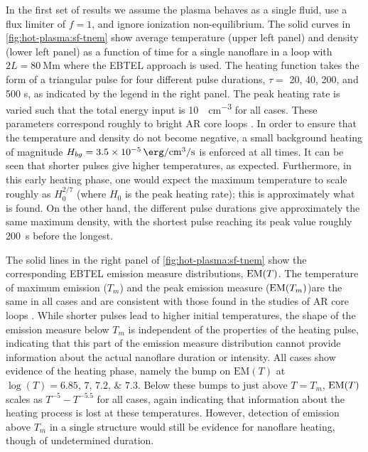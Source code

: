 In the first set of results we assume the plasma behaves as a single fluid, use a flux limiter of $f=1$, and ignore ionization non-equilibrium. The solid curves in \autoref{fig:hot-plasma:sf-tnem} show average temperature (upper left panel) and density (lower left panel) as a function of time for a single nanoflare in a loop with $2L = \SI{80}{\mega\m}$ where the EBTEL approach is used.  The heating function takes the form of a triangular pulse for four different pulse durations, $\tau=$ 20, 40, 200, and 500 s, as indicated by the legend in the right panel. The peak heating rate is varied such that the total energy input is \SI{10}{\erg\per\cubic\cm} for all cases. These parameters correspond roughly to bright AR core loops \citep{warren_systematic_2012}. In order to ensure that the temperature and density do not become negative, a small background heating of magnitude $H_{bg}=\SI{3.5e-5}{\erg\per\cubic\cm\per\second}$ is enforced at all times. It can be seen that shorter pulses give higher temperatures, as expected. Furthermore, in this early heating phase, one would expect the maximum temperature to scale roughly as $H_0^{2/7}$ (where $H_0$ is the peak heating rate); this is approximately what is found. On the other hand, the different pulse durations give approximately the same maximum density, with the shortest pulse reaching its peak value roughly \SI{200}{\second} before the longest.

The solid lines in the right panel of \autoref{fig:hot-plasma:sf-tnem} show the corresponding EBTEL emission measure distributions, $\emd[T]$. The temperature of maximum emission ($T_m$) and the peak emission measure ($\emd[T_m]$)are the same in all cases and are consistent with those found in the studies of AR core loops \citep[e.g.][]{warren_systematic_2012}. While shorter pulses lead to higher initial temperatures, the shape of the emission measure below $T_m$ is independent of the properties of the heating pulse, indicating that this part of the emission measure distribution cannot provide information about the actual nanoflare duration or intensity. All cases show evidence of the heating phase, namely the bump on $\mathrm{EM}(T)$ at $\log{(T)}=\numlist[list-final-separator = {,}]{6.85;7;7.2;7.3}$. Below these bumps to just above $T = T_m$, $\emd[T]$ scales as $T^{-5}-T^{-5.5}$ for all cases, again indicating that information about the heating process is lost at these temperatures. However, detection of emission above $T_m$ in a single structure would still be evidence for nanoflare heating, though of undetermined duration.

